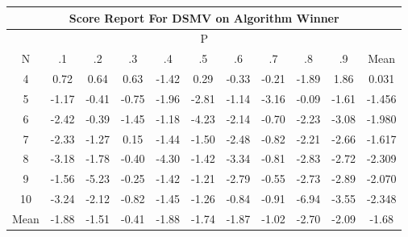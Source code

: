\documentclass[11pt,a4paper]{report}
\begin{document}
\begin{longtable}{ | c || c | c | c | c | c | c | c | c | c || c |}
\hline
\multicolumn{11}{|c|}{ Score Report For DSMV on Algorithm Winner} \\
\hline
\multicolumn{11}{|c|}{ P } \\
\hline
N & .1 & .2 & .3 & .4 & .5 & .6 & .7 & .8 & .9 & Mean\\
 \hline
 \hline
 \endhead
  4 &  \cellcolor[HTML]{EFEFFF} 0.72 &  \cellcolor[HTML]{EFEFFF} 0.64 &  \cellcolor[HTML]{EFEFFF} 0.63 &  \cellcolor[HTML]{FFDFDF} -1.42 &  \cellcolor[HTML]{F7F7FF} 0.29 &  \cellcolor[HTML]{FFF7F7} -0.33 &  \cellcolor[HTML]{FFF7F7} -0.21 &  \cellcolor[HTML]{FFCFCF} -1.89 &  \cellcolor[HTML]{CFCFFF} 1.86 & 0.031 \\
  5 &  \cellcolor[HTML]{FFDFDF} -1.17 &  \cellcolor[HTML]{FFF7F7} -0.41 &  \cellcolor[HTML]{FFEFEF} -0.75 &  \cellcolor[HTML]{FFCFCF} -1.96 &  \cellcolor[HTML]{FFB7B7} -2.81 &  \cellcolor[HTML]{FFDFDF} -1.14 &  \cellcolor[HTML]{FFAFAF} -3.16 &  \cellcolor[HTML]{FFFFFF} -0.09 &  \cellcolor[HTML]{FFD7D7} -1.61 & -1.456 \\
  6 &  \cellcolor[HTML]{FFBFBF} -2.42 &  \cellcolor[HTML]{FFF7F7} -0.39 &  \cellcolor[HTML]{FFD7D7} -1.45 &  \cellcolor[HTML]{FFDFDF} -1.18 &  \cellcolor[HTML]{FF9797} -4.23 &  \cellcolor[HTML]{FFC7C7} -2.14 &  \cellcolor[HTML]{FFEFEF} -0.70 &  \cellcolor[HTML]{FFC7C7} -2.23 &  \cellcolor[HTML]{FFAFAF} -3.08 & -1.980 \\
  7 &  \cellcolor[HTML]{FFC7C7} -2.33 &  \cellcolor[HTML]{FFDFDF} -1.27 &  \cellcolor[HTML]{FFFFFF} 0.15 &  \cellcolor[HTML]{FFD7D7} -1.44 &  \cellcolor[HTML]{FFD7D7} -1.50 &  \cellcolor[HTML]{FFBFBF} -2.48 &  \cellcolor[HTML]{FFE7E7} -0.82 &  \cellcolor[HTML]{FFC7C7} -2.21 &  \cellcolor[HTML]{FFBFBF} -2.66 & -1.617 \\
  8 &  \cellcolor[HTML]{FFAFAF} -3.18 &  \cellcolor[HTML]{FFCFCF} -1.78 &  \cellcolor[HTML]{FFF7F7} -0.40 &  \cellcolor[HTML]{FF8F8F} -4.30 &  \cellcolor[HTML]{FFDFDF} -1.42 &  \cellcolor[HTML]{FFA7A7} -3.34 &  \cellcolor[HTML]{FFE7E7} -0.81 &  \cellcolor[HTML]{FFB7B7} -2.83 &  \cellcolor[HTML]{FFB7B7} -2.72 & -2.309 \\
  9 &  \cellcolor[HTML]{FFD7D7} -1.56 &  \cellcolor[HTML]{FF8080} -5.23 &  \cellcolor[HTML]{FFF7F7} -0.25 &  \cellcolor[HTML]{FFDFDF} -1.42 &  \cellcolor[HTML]{FFDFDF} -1.21 &  \cellcolor[HTML]{FFB7B7} -2.79 &  \cellcolor[HTML]{FFEFEF} -0.55 &  \cellcolor[HTML]{FFB7B7} -2.73 &  \cellcolor[HTML]{FFB7B7} -2.89 & -2.070 \\
  10 &  \cellcolor[HTML]{FFAFAF} -3.24 &  \cellcolor[HTML]{FFC7C7} -2.12 &  \cellcolor[HTML]{FFE7E7} -0.82 &  \cellcolor[HTML]{FFD7D7} -1.45 &  \cellcolor[HTML]{FFDFDF} -1.26 &  \cellcolor[HTML]{FFE7E7} -0.84 &  \cellcolor[HTML]{FFE7E7} -0.91 &  \cellcolor[HTML]{FF5050} -6.94 &  \cellcolor[HTML]{FFA7A7} -3.55 & -2.348 \\
 \hline
 \hline
Mean &  \cellcolor[HTML]{FFCFCF} -1.88 &  \cellcolor[HTML]{FFD7D7} -1.51 &  \cellcolor[HTML]{FFF7F7} -0.41 &  \cellcolor[HTML]{FFCFCF} -1.88 &  \cellcolor[HTML]{FFD7D7} -1.74 &  \cellcolor[HTML]{FFCFCF} -1.87 &  \cellcolor[HTML]{FFE7E7} -1.02 &  \cellcolor[HTML]{FFB7B7} -2.70 &  \cellcolor[HTML]{FFC7C7} -2.09 &  \cellcolor[HTML]{FFD7D7} -1.68
\end{longtable}
\end{document}
